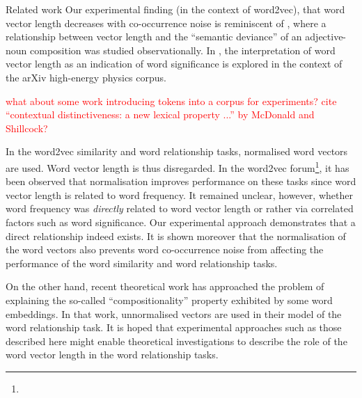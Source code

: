 \documentclass{article} %
\begin{document}
\begin{section}{Related work}\label{related-work}
Our experimental finding (in the context of word2vec), that word vector length decreases with co-occurrence noise is reminiscent of \cite{vecchi-baroni-zamparelli2011}, where a relationship between vector length and the ``semantic deviance'' of an adjective-noun composition was studied observationally.
In \cite{schakel-wilson}, the interpretation of word vector length as an indication of word significance is explored in the context of the arXiv high-energy physics corpus.

\textcolor{red}{what about some work introducing tokens into a corpus for experiments?}
\textcolor{red}{cite ``contextual distinctiveness: a new lexical property ...'' by McDonald and Shillcock?}

In the word2vec similarity and word relationship tasks, normalised word vectors are used.
Word vector length is thus disregarded.
In the word2vec forum\footnote{\googlegroup}, it has been observed that normalisation improves performance on these tasks since word vector length is related to word frequency.
It remained unclear, however, whether word frequency was \textit{directly} related to word vector length or rather via correlated factors such as word significance.
Our experimental approach demonstrates that a direct relationship indeed exists.
It is shown moreover that the normalisation of the word vectors also prevents word co-occurrence noise from affecting the performance of the word similarity and word relationship tasks.

On the other hand, recent theoretical work \cite{Arora2015} has approached the problem of explaining the so-called ``compositionality'' property exhibited by some word embeddings.
In that work, unnormalised vectors are used in their model of the word relationship task.
It is hoped that experimental approaches such as those described here might enable theoretical investigations to describe the role of the word vector length in the word relationship tasks.
\end{section}
\end{document}
